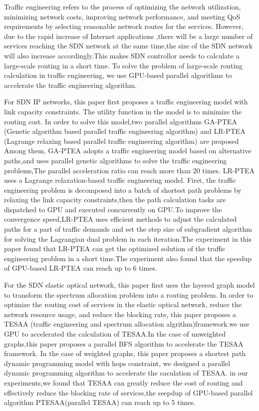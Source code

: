 \documentclass[master]{thesis-uestc}
\begin{document}
\begin{englishabstract}

Traffic engineering refers to the process of optimizing the network utilization, minimizing network costs, improving network performance, and meeting QoS requirements by selecting reasonable network routes for the services. However, due to the rapid increase of Internet applications ,there will be a large number of services reaching the SDN network at the same time,the size of the SDN network will also increase accordingly.This makes SDN controllor needs to calculate a large-scale routing in a short time. To solve the problem of large-scale routing calculation in traffic engineering, we use GPU-based parallel algorithms to accelerate the traffic engineering algorithm.

For SDN IP networks, this paper first proposes a traffic engineering model with link capacity constraints. The utility function in the model is to minimize the routing cost. In order to solve this model,two parallel algorithms GA-PTEA (Genetic algorithm based parallel traffic engineering algorithm) and LR-PTEA (Lagrange relaxing based parallel traffic engineering algorithm) are proposed
Among them, GA-PTEA adopts a traffic engineering model based on alternative paths,and uses parallel genetic algorithms to solve the traffic engineering problems,The parallel acceleration ratio can reach more than 20 times. LR-PTEA uses a Lagrange relaxation-based traffic engineering model. First, the traffic engineering problem is decomposed into a batch of shortest path problems by relaxing the link capacity constraints,then the path calculation tasks are dispatched to GPU and executed concurrently on GPU.To improve the convergence speed,LR-PTEA uses efficient methods to adjust the calculated paths for a part of traffic demands and set the step size of subgradient algorithm for solving the Lagrangian dual problem in each iteration.The experiment in this paper found that LR-PTEA can get the optimized solution of the traffic engineering problem in a short time.The experiment also found that the speedup of GPU-based LR-PTEA can reach up to 6 times.

For the SDN elastic optical network, this paper first uses the layered graph model to transform the spectrum allocation problem into a routing problem. In order to optimize the routing cost of services in the elastic optical network, reduce the network resource usage, and reduce the blocking rate, this paper proposes a TESAA (traffic engineering and spectrum allocation algrithm)framework.we use GPU to accelerated the calculation of TESAA.In the case of unweighted graphs,this paper proposes a parallel BFS algorithm to accelerate the TESAA framework. In the case of weighted graphs, this paper proposes a shortest path dynamic programming model with hops constraint, we designed a parallel dynamic programming algorithm to accelerate the caculation of TESAA. in our experiments,we found that TESAA can greatly reduce the cost of routing and effectively reduce the blocking rate of services,the seepdup of GPU-based parallel algorithm PTESAA(parallel TESAA) can reach up to 5 times.

\end{englishabstract}
\end{document}

